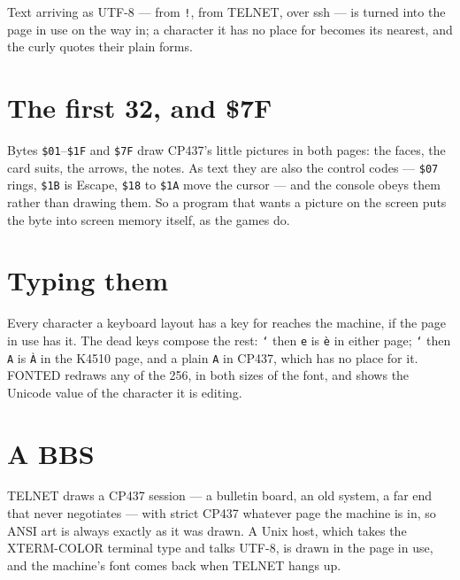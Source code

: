 Text arriving as UTF-8 --- from \texttt{!}, from TELNET, over ssh --- is
turned into the page in use on the way in; a character it has no place for
becomes its nearest, and the curly quotes their plain forms.

\section{The first 32, and \$7F}
Bytes \texttt{\$01}--\texttt{\$1F} and \texttt{\$7F} draw CP437's little
pictures in both pages: the faces, the card suits, the arrows, the notes.
As text they are also the control codes --- \texttt{\$07} rings,
\texttt{\$1B} is Escape, \texttt{\$18} to \texttt{\$1A} move the cursor ---
and the console obeys them rather than drawing them. So a program that
wants a picture on the screen puts the byte into screen memory itself, as
the games do.

\section{Typing them}
Every character a keyboard layout has a key for reaches the machine, if
the page in use has it. The dead keys compose the rest: \texttt{`} then
\texttt{e} is \texttt{è} in either page; \texttt{`} then \texttt{A} is
\texttt{À} in the K4510 page, and a plain \texttt{A} in CP437, which has
no place for it. FONTED redraws any of the 256, in both sizes of the font,
and shows the Unicode value of the character it is editing.

\section{A BBS}
TELNET draws a CP437 session --- a bulletin board, an old system, a far
end that never negotiates --- with strict CP437 whatever page the machine
is in, so ANSI art is always exactly as it was drawn. A Unix host, which
takes the XTERM-COLOR terminal type and talks UTF-8, is drawn in the page
in use, and the machine's font comes back when TELNET hangs up.
